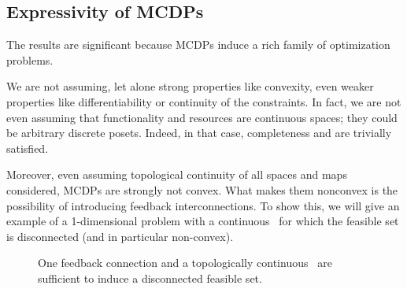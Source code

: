 \subsection{Expressivity of MCDPs}
The results are significant because MCDPs induce a rich family of
optimization problems.

We are not assuming, let alone strong properties like convexity, even
weaker properties like differentiability or continuity of the constraints. 
In fact, we are not even assuming that functionality and resources
are continuous spaces; they could be arbitrary discrete posets.
Indeed, in that case, completeness and \scottcontinuity are trivially satisfied.


Moreover, even assuming topological continuity of all spaces and maps
considered, MCDPs are strongly not convex. What makes them nonconvex
is the possibility of introducing feedback interconnections. To show
this, we will give an example of a 1-dimensional problem with a continuous~\ftor
for which the feasible set is disconnected (and in particular non-convex).

\begin{figure}[h]
  \hfill
  \hfill
  \hfill
  \caption{One feedback connection and a topologically continuous~\ftor
  are sufficient to induce a disconnected feasible set.}
  \label{fig:ceil-1}
\end{figure}

\medskip{}

